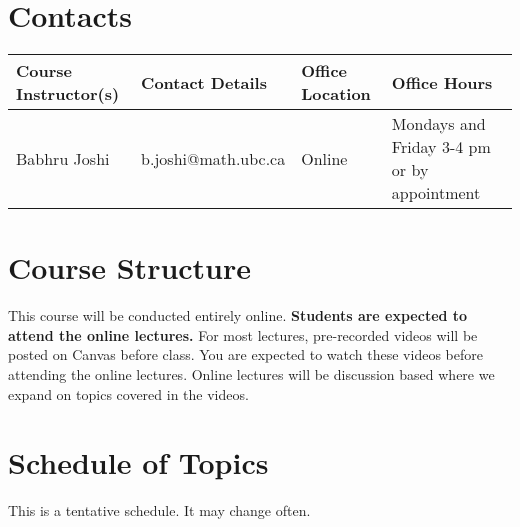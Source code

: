 \documentclass[12pt,usletter]{article} %
\begin{document}
\section*{Contacts}

\begin{tabu} to \textwidth{ | X[l] | X[l] | X[l] | X[l] | }
\hline 
{}
\textbf{Course Instructor(s)} &
\textbf{Contact Details} &
\textbf{Office Location} &
\textbf{Office Hours} \\
\hline
\relax Babhru Joshi &
\relax b.joshi@math.ubc.ca &
\relax Online &
\relax Mondays and Friday 3-4 pm or by appointment \\
%
\hline
\end{tabu}

\section*{Course Structure}

This course will be conducted entirely online. \textbf{Students are expected to attend the online lectures.} For most lectures, pre-recorded videos will be posted on Canvas before class. You are expected to watch these videos before attending the online lectures. Online lectures will be discussion based where we expand on topics covered in the videos.

\section*{Schedule of Topics}

This is a tentative schedule. It may change often.
\end{document}

